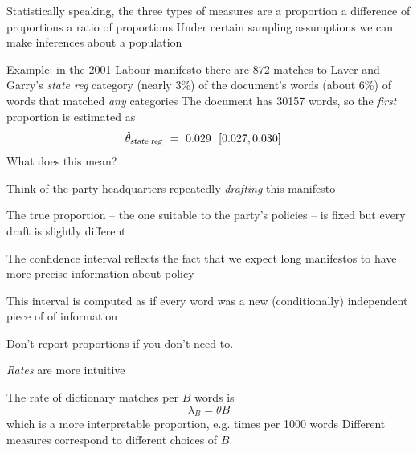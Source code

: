 \documentclass{mediumfoils}
\begin{document}
 Statistically speaking, the three types of measures are
\ita
\itm a proportion
\itm a difference of proportions
\itm a ratio of proportions
\itz
Under certain sampling assumptions we can make inferences about a population

%


Example: in the 2001 Labour manifesto there are 872 matches to Laver and Garry's \textsl{state reg} category
\ita
{} (nearly 3\%) of the document's words
 (about 6\%) of words that matched \textsl{any} categories
\itz
 The document has 30157 words, so the \textsl{first} proportion is estimated as 
\begin{align*}
\hat{\theta}_\text{\textsl{state reg}} & ~=~ 0.029 ~~[0.027, 0.030]
\end{align*}
What does this mean?  


Think of the party headquarters repeatedly \textsl{drafting} this manifesto

The true proportion -- the one suitable to the party's policies -- is fixed but every draft is slightly different

The confidence interval reflects the fact that we expect long manifestos to have more precise information about policy

This interval is computed as if every word was a new (conditionally) independent piece of of information


Don't report proportions if you don't need to.  

\textsl{Rates} are more intuitive

The rate of dictionary matches per $B$ words is
\[
\lambda_B = \theta B
\]
which is a more interpretable proportion, 
e.g. 
\ita
{} times per 1000 words
\itz
Different measures correspond to different choices of $B$.
\end{document}
